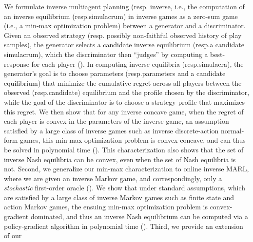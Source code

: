 We formulate inverse multiagent planning (resp. inverse, i.e., the computation of an inverse equilibrium (resp.\@ simulacrum) in inverse games as a zero-sum game (i.e., a min-max optimization problem) between a generator and a discriminator.
Given an observed strategy (resp. possibly non-faithful observed history of play samples), the generator selects a candidate inverse equilibrium (resp.\@ a candidate simulacrum), which the discriminator then ``judges'' by computing a best-response for each player ().
In computing inverse equilibria (resp.\@ simulacra), the generator's goal is to choose parameters (resp.\@ parameters and a candidate equilibrium) that minimize the cumulative regret across all players
between the observed (resp.\@ candidate) equilibrium and the profile chosen by the discriminator, while the goal of the discriminator is to choose a strategy profile that maximizes this regret.
We then show that for any inverse concave game, when the regret of each player is convex in the parameters of the inverse game, an assumption satisfied by a large class of inverse games such as inverse discrete-action normal-form games, this min-max optimization problem is convex-concave, and can thus be solved in polynomial time ().
This characterization also shows that the set of inverse Nash equilibria can be convex, even when the set of Nash equilibria is not.
Second, we generalize our min-max characterization to online inverse MARL, where we are given an inverse Markov game, and 
correspondingly, only a \emph{stochastic\/} first-order oracle ().
We show that under standard assumptions, which are satisfied by a large class of inverse Markov games such as finite state and action Markov games, the ensuing min-max optimization problem is convex-gradient dominated, and thus an inverse Nash equilibrium can be computed via a policy-gradient algorithm in polynomial time ().
%
Third, we provide an extension of our
